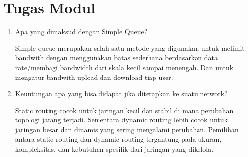 \section*{Tugas Modul} %
\begin{enumerate}
    \item Apa yang dimaksud dengan Simple Queue?
    
        Simple queue merupakan salah satu metode yang digunakan untuk melimit bandwith dengan menggunakan batas sederhana berdasarkan data rate/membagi bandwidth dari skala kecil sampai menengah. Dan untuk mengatur bandwith upload dan download tiap user.
    
    \item Keuntungan apa yang bisa didapat jika diterapkan ke suatu network?
        
        Static routing cocok untuk jaringan kecil dan stabil di mana perubahan topologi jarang terjadi. Sementara dynamic routing lebih cocok untuk jaringan besar dan dinamis yang sering mengalami perubahan. Pemilihan antara static routing dan dynamic routing tergantung pada ukuran, kompleksitas, dan kebutuhan spesifik dari jaringan yang dikelola.
 
\end{enumerate}

